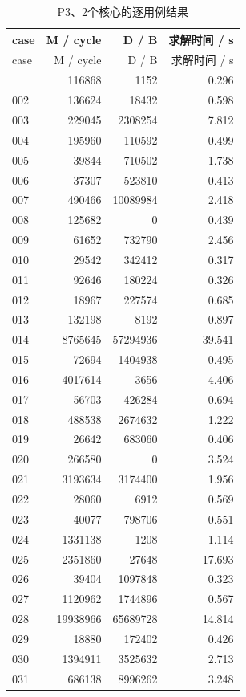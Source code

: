 \documentclass[anonymous,notoc]{gmcm2026}
\begin{document}
\begin{longtable}{lrrr}
\caption{P3、2个核心的逐用例结果}\\
\toprule
case & M / cycle & D / B & 求解时间 / s\\\midrule
\endfirsthead
\toprule
case & M / cycle & D / B & 求解时间 / s\\\midrule
\endhead
\bottomrule\endfoot
001 & 116868 & 1152 & 0.296 \\
002 & 136624 & 18432 & 0.598 \\
003 & 229045 & 2308254 & 7.812 \\
004 & 195960 & 110592 & 0.499 \\
005 & 39844 & 710502 & 1.738 \\
006 & 37307 & 523810 & 0.413 \\
007 & 490466 & 10089984 & 2.418 \\
008 & 125682 & 0 & 0.439 \\
009 & 61652 & 732790 & 2.456 \\
010 & 29542 & 342412 & 0.317 \\
011 & 92646 & 180224 & 0.326 \\
012 & 18967 & 227574 & 0.685 \\
013 & 132198 & 8192 & 0.897 \\
014 & 8765645 & 57294936 & 39.541 \\
015 & 72694 & 1404938 & 0.495 \\
016 & 4017614 & 3656 & 4.406 \\
017 & 56703 & 426284 & 0.694 \\
018 & 488538 & 2674632 & 1.222 \\
019 & 26642 & 683060 & 0.406 \\
020 & 266580 & 0 & 3.524 \\
021 & 3193634 & 3174400 & 1.956 \\
022 & 28060 & 6912 & 0.569 \\
023 & 40077 & 798706 & 0.551 \\
024 & 1331138 & 1208 & 1.114 \\
025 & 2351860 & 27648 & 17.693 \\
026 & 39404 & 1097848 & 0.323 \\
027 & 1120962 & 1744896 & 0.567 \\
028 & 19938966 & 65689728 & 14.814 \\
029 & 18880 & 172402 & 0.426 \\
030 & 1394911 & 3525632 & 2.713 \\
031 & 686138 & 8996262 & 3.248 \\

\end{longtable}
\end{document}

